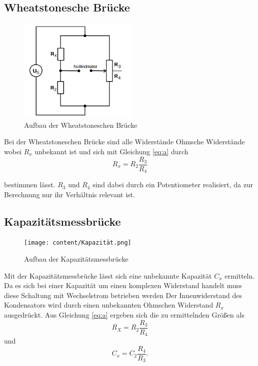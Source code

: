 \subsection{Wheatstonesche Brücke}
\begin{figure}[H]
\centering
    \includegraphics[height= 5cm]{content/Wheatstone.png}
    \caption{Aufbau der Wheatstoneschen Brücke\cite[219]{sample}}
\end{figure}
\noindent Bei der Wheatstoneschen Brücke sind alle
Widerstände Ohmsche Widerstände wobei $R_x$ unbekannt
ist und sich mit Gleichung \ref{eq:a} durch
\begin{equation}
    R_x=R_2\frac{R_3}{R_4}
\end{equation}

\noindent bestimmen lässt. $R_3$ und $R_4$ sind dabei
durch ein Potentiometer realisiert, da zur Berechnung
nur ihr Verhältnis relevant ist.


\subsection{Kapazitätsmessbrücke}
\label{sec:Kap}
\begin{figure}[H]
\centering
    \texttt{[image: content/Kapazität.png]}
    \caption{Aufbau der Kapazitätsmessbrücke\cite[220]{sample}}
\end{figure}
\noindent Mit der Kapazitätsmessbrücke lässt sich eine
unbekannte Kapazität $C_x$ ermitteln. Da es sich
bei einer Kapazität um einen komplexen Widerstand handelt
muss diese Schaltung mit Wechselstrom betrieben werden
Der Innenwiderstand des Kondensators wird durch einen
unbekannten Ohmschen Widerstand $R_x$ ausgedrückt.
Aus Gleichung \ref{eq:a} ergeben sich die zu ermittelnden
Größen als
\begin{equation}
    R_X=R_2\frac{R_3}{R_4}
\end{equation}
\noindent und
\begin{equation}
    C_x=C_2\frac{R_4}{R_3}.
\end{equation}




